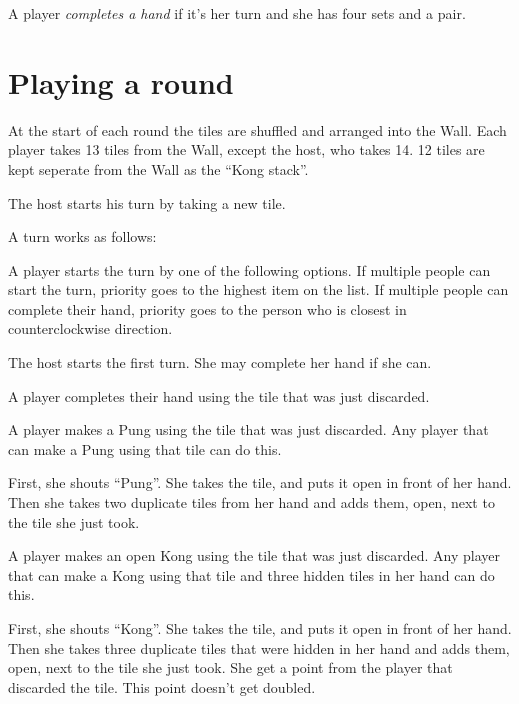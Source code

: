 \documentclass{article}
\begin{document}
A player \emph{completes a hand} if it's her turn and she has four sets and a pair.

\section{Playing a round}
At the start of each round the tiles are shuffled and arranged into the Wall. Each player takes 13 tiles from the Wall, except the host, who takes 14. 12 tiles are kept seperate from the Wall as the ``Kong stack''.

The host starts his turn by taking a new tile.

A turn works as follows:
\begin{enumerate*}
    \item A player starts the turn by one of the following options. If multiple people can start the turn, priority goes to the highest item on the list. If multiple people can complete their hand, priority goes to the person who is closest in counterclockwise direction.
    \begin{enumerate*}
        \item The host starts the first turn. She may complete her hand if she can.
        \item A player completes their hand using the tile that was just discarded.
        \item A player makes a Pung using the tile that was just discarded. Any player that can make a Pung using that tile can do this.

        First, she shouts ``Pung''. She takes the tile, and puts it open in front of her hand. Then she takes two duplicate tiles from her hand and adds them, open, next to the tile she just took.
        \item A player makes an open Kong using the tile that was just discarded. Any player that can make a Kong using that tile and three hidden tiles in her hand can do this.

        First, she shouts ``Kong''. She takes the tile, and puts it open in front of her hand. Then she takes three duplicate tiles that were hidden in her hand and adds them, open, next to the tile she just took.
        She get a point from the player that discarded the tile. This point doesn't get doubled.


\end{enumerate*}
\end{enumerate*}
\end{document}

